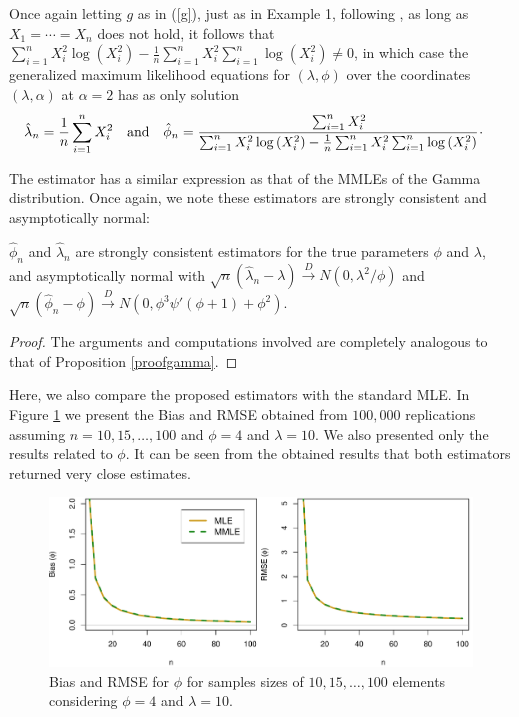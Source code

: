 \documentclass[lineno]{biometrika}
\begin{document}
Once again letting $g$ as in (\ref{g}), just as in Example 1, following \cite{ramos2020bias}, as long as $X_1=\cdots=X_n$ does not hold, it follows that $\sum_{i=1}^n X_i^2 \log\left(X_i^2\right) -\frac{1}{n}\sum_{i=1}^n X_i^2\sum_{i=1}^n \log\left(X_i^2\right)\neq 0$, in which case the generalized maximum likelihood equations for $(\lambda,\phi)$ over the coordinates $(\lambda,\alpha)$ at $\alpha=2$ has as only solution
\begin{equation*}\label{vinkom}
\begin{aligned}
&\hat\lambda_n=\frac{1}{n}\sum_{i=1}^n{X_i^2} \ \ \mbox{ and } \ \
\hat\phi_n=\cfrac{\sum_{i=1}^n X_i^{2}}{\sum_{i=1}^{n}X_i^{2} \log\left(X_i^2\right) - \frac{1}{n}\sum_{i=1}^n X_i^{2} \sum_{i=1}^n \log\left(X_i^2\right)} \, \cdot
\end{aligned}
\end{equation*}

The estimator has a similar expression as that of the MMLEs of the Gamma distribution. Once again, we note these estimators are strongly consistent and asymptotically normal:

\begin{proposition}\label{proofnakagami} $\hat\phi_n$ and $\hat\lambda_n$ are strongly consistent estimators for the true parameters $\phi$ and $\lambda$, and asymptotically normal with $\sqrt{n}\left(\hat{\lambda}_n-\lambda\right)\overset{D}{\to} N\left(0,\lambda^2/\phi\right)$ and $\sqrt{n}\left(\hat{\phi}_n-\phi\right)\overset{D}{\to} N\left(0,\phi^3\psi'(\phi+1)+\phi^2\right)$.
\end{proposition}
\begin{proof} The arguments and computations involved are completely analogous to that of Proposition \ref{proofgamma}.
\end{proof}

Here, we also compare the proposed estimators with the standard MLE. In Figure \ref{fg2} we present the Bias and RMSE obtained from $100,000$ replications assuming $n=10,15,\ldots,100$ and $\phi=4$ and $\lambda=10$. We also presented only the results related to $\phi$. It can be seen from the obtained results that both estimators returned very close estimates.

\begin{figure}[!ht]
\centering
\includegraphics[scale=0.6]{biasnakagami.pdf}	
\caption{Bias and RMSE for $\phi$ for samples sizes of $10,15,\ldots,100$ elements considering $\phi=4$ and $\lambda=10$.}\label{fg2}
\end{figure}	
\end{document}

